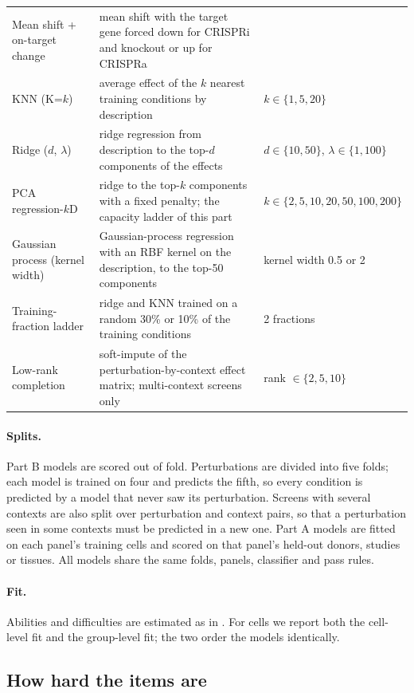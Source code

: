 \documentclass[]{style}
\begin{document}
\begin{table}[t]
\begin{tabularx}{\textwidth}{@{}lXl@{}}
Mean shift + on-target change & mean shift with the target gene forced down for CRISPRi and knockout or up for CRISPRa & \\
KNN (K=$k$) & average effect of the $k$ nearest training conditions by description & $k\in\{1,5,20\}$ \\
Ridge ($d$, $\lambda$) & ridge regression from description to the top-$d$ components of the effects & $d\in\{10,50\}$, $\lambda\in\{1,100\}$ \\
PCA regression-$k$D & ridge to the top-$k$ components with a fixed penalty; the capacity ladder of this part & $k\in\{2,5,10,20,50,100,200\}$ \\
Gaussian process (kernel width) & Gaussian-process regression with an RBF kernel on the description, to the top-50 components & kernel width 0.5 or 2 \\
Training-fraction ladder & ridge and KNN trained on a random 30\% or 10\% of the training conditions & 2 fractions \\
Low-rank completion & soft-impute of the perturbation-by-context effect matrix; multi-context screens only & rank $\in\{2,5,10\}$ \\
\bottomrule
\end{tabularx}
\end{table}

\paragraph{Splits.}
Part B models are scored out of fold. Perturbations are divided into five folds; each
model is trained on four and predicts the fifth, so every condition is predicted by a model
that never saw its perturbation. Screens with several contexts are also split over
perturbation and context pairs, so that a perturbation seen in some contexts must be
predicted in a new one. Part A models are fitted on each panel's training cells and
scored on that panel's held-out donors, studies or tissues. All models share the same
folds, panels, classifier and pass rules.

\paragraph{Fit.}
Abilities and difficulties are estimated as in . For cells we report
both the cell-level fit and the group-level fit; the two order the models identically.

\subsection{How hard the items are}
\label{sec:difficulty}
\end{document}
